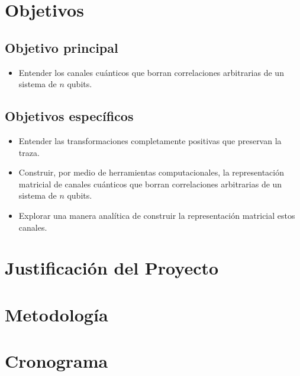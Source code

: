 \documentclass[11pt, spanish, letterpage]{article}
\begin{document}
\section{Objetivos}
\subsection{Objetivo principal}
\begin{itemize}
	\item Entender los canales cuánticos que borran correlaciones arbitrarias de un sistema de $n$ qubits. 	
\end{itemize}

\subsection{Objetivos específicos}
\begin{itemize}
	\item Entender las transformaciones completamente positivas que preservan la traza. 
	\item Construir, por medio de herramientas computacionales, la representación matricial de canales cuánticos que borran correlaciones arbitrarias de un sistema de $n$ qubits. 
	\item Explorar una manera analítica de construir la representación matricial estos canales.
\end{itemize}

\section{Justificación del Proyecto}


\section{Metodología}


\section{Cronograma}
\end{document}
